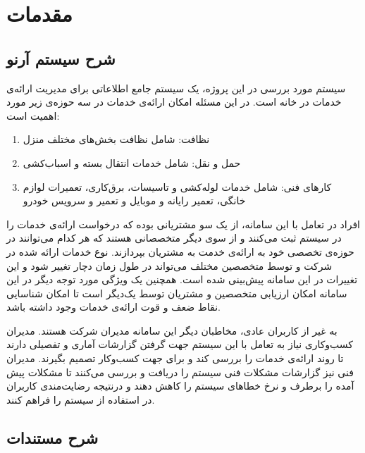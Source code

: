 
\chapter{مقدمات}

\section{شرح سیستم آرنو}

سیستم مورد بررسی در این پروژه، ‌یک سیستم جامع اطلاعاتی برای مدیریت ارائه‌ی خدمات در خانه است. 
در این مسئله امکان ارائه‌ی خدمات در سه حوزه‌ی زیر مورد اهمیت است:

\begin{enumerate}
\item
نظافت: شامل نظافت بخش‌های مختلف منزل 
\item
حمل و نقل: شامل خدمات انتقال بسته و اسباب‌کشی
\item 
کارهای فنی: شامل خدمات لوله‌کشی و تاسیسات، برق‌کاری، تعمیرات لوازم خانگی، تعمیر رایانه و موبایل و تعمیر و سرویس خودرو

\end{enumerate}

افراد در تعامل با این سامانه، از یک سو مشتریانی بوده که درخواست ارائه‌ی خدمات را در سیستم ثبت می‌کنند و از سوی دیگر متخصصانی هستند که هر کدام می‌توانند در حوزه‌ی تخصصی خود به ارائه‌ی خدمت به مشتریان بپردازند. نوع خدمات ارائه شده در شرکت و توسط متخصصین مختلف می‌تواند در طول زمان دچار تغییر شود و این تغییرات در این سامانه پیش‌بینی شده است. همچنین یک ویژگی مورد توجه دیگر در این سامانه امکان ارزیابی متخصصین و مشتریان توسط یک‌دیگر است تا امکان شناسایی نقاط ضعف و قوت ارائه‌ی خدمات وجود داشته باشد.

به غیر از کاربران عادی، مخاطبان دیگر این سامانه مدیران شرکت هستند. مدیران کسب‌وکاری نیاز به تعامل با این سیستم جهت گرفتن گزارشات آماری و تفصیلی دارند تا روند ارائه‌ی خدمات را بررسی کند و برای جهت کسب‌و‌کار تصمیم بگیرند. مدیران فنی نیز گزارشات مشکلات فنی سیستم را دریافت و بررسی می‌کنند تا مشکلات پیش آمده را برطرف و نرخ خطاهای سیستم را کاهش دهند و درنتیجه رضایت‌مندی کاربران در استفاده از سیستم را فراهم کنند.


\section{شرح مستندات}


